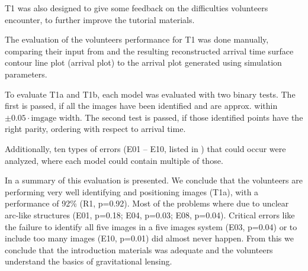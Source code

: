 T1 was also designed to give some feedback on the difficulties volunteers encounter, to further improve the tutorial materials.



The evaluation of the volunteers performance for T1 was done manually, comparing their input from \spl and the resulting reconstructed arrival time surface contour line plot (arrival plot) to the arrival plot generated using simulation parameters.


To evaluate T1a and T1b, each model was evaluated with two binary tests.
The first is passed, if all the images have been identified and are approx. within $\pm0.05\cdot\text{imgage width}$.
The second test is passed, if those identified points have the right parity, ordering with respect to arrival time.

Additionally, ten types of errors (E01 -- E10, listed in ) that could occur were analyzed, where each model could contain multiple of those.




In  a summary of this evaluation is presented.
We conclude that the volunteers are performing very well identifying and positioning images (T1a), with a performance of 92\% (R1, p=0.92).
Most of the problems where due to unclear arc-like structures (E01, p=0.18; E04, p=0.03; E08, p=0.04).
Critical errors like the failure to identify all five images in a five images system (E03, p=0.04) or to include too many images (E10, p=0.01) did almost never happen.
From this we conclude that the introduction materials was adequate and the volunteers understand the basics of gravitational lensing.


